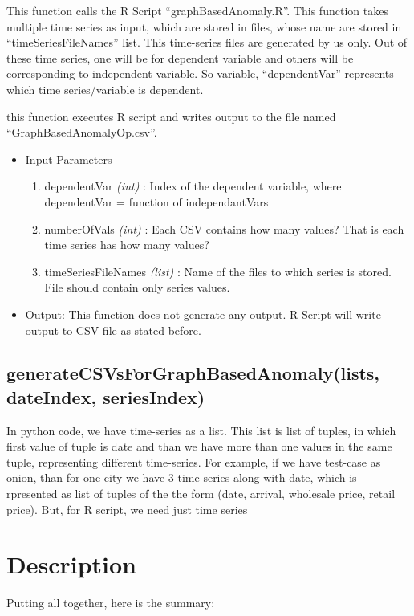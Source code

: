 This function calls the R Script ``graphBasedAnomaly.R''. This function takes 
multiple time series as input, which are stored in files, whose name are stored 
in ``timeSeriesFileNames'' list. This time-series files are generated by us 
only. Out of these time series, one will be for dependent variable and others 
will be corresponding to independent variable. So variable, ``dependentVar'' 
represents which time series/variable is dependent.

this function executes R script and writes output to the file named 
``GraphBasedAnomalyOp.csv''.

\begin{itemize}
 \item Input Parameters
 
 \begin{enumerate}
  \item dependentVar \textit{(int)} : Index of the dependent variable, where 
dependentVar = function of independantVars
  \item numberOfVals \textit{(int)} : Each CSV contains how many values? That is 
each time series has how many values?
  \item timeSeriesFileNames \textit{(list)} : Name of the files to which series 
is stored. File should contain only series values.

 \end{enumerate}

 \item Output: This function does not generate any output. R Script will write 
output to CSV file as stated before.

 
\end{itemize}


\subsection{generateCSVsForGraphBasedAnomaly(lists, dateIndex, seriesIndex)}

In python code, we have time-series as a list. This list is list of tuples, in 
which first value of tuple is date and than we have more than one values in the 
same tuple, representing different time-series. For example, if we have 
test-case as onion, than for one city we have 3 time series along with date, 
which is rpresented as list of tuples of the the form (date, arrival, wholesale 
price, retail price). But, for R script, we need just time series 

\section{Description}

Putting all together, here is the summary:\\
\\
